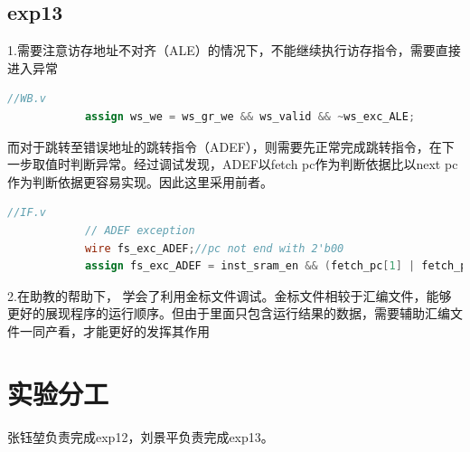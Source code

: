 \documentclass[12pt,a4paper]{article}
\newcommand*{\song}{\CJKfamily{zhsong}}
\newcommand{\sectionfont}{\song\textbf}
\begin{document}
    \subsection{exp13}
        1.需要注意访存地址不对齐（ALE）的情况下，不能继续执行访存指令，需要直接进入异常
        \begin{lstlisting}[language=Verilog]
        //WB.v
            assign ws_we = ws_gr_we && ws_valid && ~ws_exc_ALE;
        \end{lstlisting}
        而对于跳转至错误地址的跳转指令（ADEF），则需要先正常完成跳转指令，在下一步取值时判断异常。经过调试发现，ADEF以fetch pc作为判断依据比以next pc作为判断依据更容易实现。因此这里采用前者。
        \begin{lstlisting}[language=Verilog]
        //IF.v
            // ADEF exception
            wire fs_exc_ADEF;//pc not end with 2'b00
            assign fs_exc_ADEF = inst_sram_en && (fetch_pc[1] | fetch_pc[0]);
        \end{lstlisting}
        2.在助教的帮助下， 学会了利用金标文件调试。金标文件相较于汇编文件，能够更好的展现程序的运行顺序。但由于里面只包含运行结果的数据，需要辅助汇编文件一同产看，才能更好的发挥其作用
\section{\sectionfont 实验分工}
    张钰堃负责完成exp12，刘景平负责完成exp13。
\end{document}
